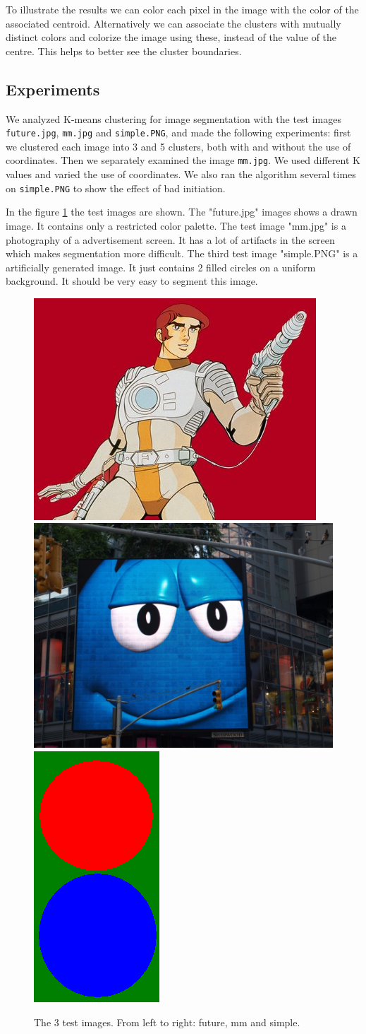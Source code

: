 To illustrate the results we can color each pixel in the image with the color of the associated centroid. Alternatively we can associate the clusters with mutually distinct colors and colorize the image using these, instead of the value of the centre. This helps to better see the cluster boundaries.

\subsection{Experiments}

We analyzed K-means clustering for image segmentation with the test images \texttt{future.jpg}, \texttt{mm.jpg} and \texttt{simple.PNG}, and made the following experiments: first we clustered each image into 3 and 5 clusters, both with and without the use of coordinates. Then we separately examined the image \texttt{mm.jpg}. We used different K values and varied the use of coordinates. We also ran the algorithm several times on \texttt{simple.PNG} to show the effect of bad initiation.

In the figure \ref{fig:testimages} the test images are shown. The "future.jpg" images shows a drawn image. It contains only a restricted color palette. The test image "mm.jpg" is a photography of a advertisement screen. It has a lot of artifacts in the screen which makes segmentation more difficult. The third test image "simple.PNG" is a artificially generated image. It just contains 2 filled circles on a uniform background. It should be very easy to segment this image.
\begin{figure}[h!]
	\includegraphics[width=0.38\linewidth]{figures/task2/future.jpg}
	\includegraphics[width=0.398\linewidth]{figures/task2/mm.jpg}
	\includegraphics[width=0.15\linewidth]{figures/task2/simple.PNG}
	\caption{The 3 test images. From left to right: future, mm and simple.}
	\label{fig:testimages}
\end{figure}


